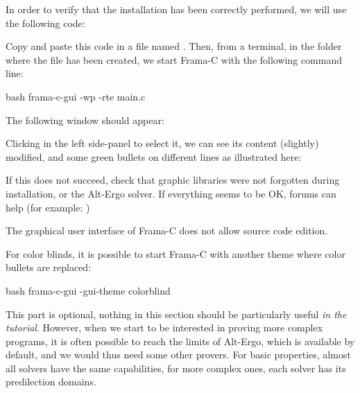

In order to verify that the installation has been correctly performed,
we will use the following code:





Copy and paste this code in a file named .
Then, from a terminal, in the folder where the file has been created, we
start Frama-C with the following command line:



\begin{CodeBlock}{bash}
frama-c-gui -wp -rte main.c
\end{CodeBlock}



The following window should appear:





Clicking  in the left side-panel to select it, we can see
its content (slightly) modified, and some green bullets on different
lines as illustrated here:





If this does not succeed, check that graphic libraries were not forgotten
during installation, or the Alt-Ergo solver. If everything seems to be OK,
forums can help (for example: )



\begin{Warning}
  The graphical user interface of Frama-C does not allow source code edition.
\end{Warning}


\begin{Information}
  For color blinds, it is possible to start Frama-C with another theme where
  color bullets are replaced:

\begin{CodeBlock}{bash}
frama-c-gui -gui-theme colorblind
\end{CodeBlock}
\end{Information}




This part is optional, nothing in this section should be particularly
useful \emph{in the tutorial}. However, when we start to be interested
in proving more complex programs, it is often possible to reach the
limits of Alt-Ergo, which is available by default, and we would thus need
some other provers. For basic properties, almost all solvers have the
same capabilities, for more complex ones, each solver has its predilection
domains.


